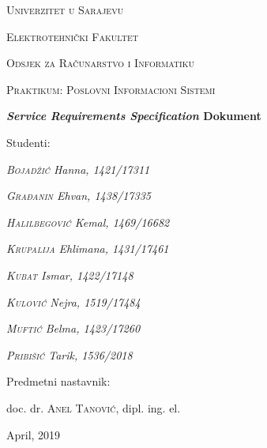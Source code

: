 \begin{titlepage}
	\centering
	{\scshape Univerzitet u Sarajevu \par}
	{\scshape Elektrotehnički Fakultet \par}
	{\scshape Odsjek za Računarstvo i Informatiku \par}
	\vspace{2cm}
	{\Large\scshape Praktikum: Poslovni Informacioni Sistemi\par}
	\vspace{2.5cm}
	{\huge\bfseries \textit{Service Requirements Specification} Dokument\par}
	\vspace{2.5cm}
	\Large Studenti: \par
	{\Large\itshape \textsc{Bojadžić} Hanna, 1421/17311\par}
	{\Large\itshape \textsc{Građanin} Ehvan, 1438/17335\par}
	{\Large\itshape \textsc{Halilbegović} Kemal, 1469/16682\par}
	{\Large\itshape \textsc{Krupalija} Ehlimana, 1431/17461\par}
	{\Large\itshape \textsc{Kubat} Ismar, 1422/17148\par}
	{\Large\itshape \textsc{Kulović} Nejra, 1519/17484\par}
	{\Large\itshape \textsc{Muftić} Belma, 1423/17260\par}
	{\Large\itshape \textsc{Pribišić} Tarik, 1536/2018\par}
	\vfill
	Predmetni nastavnik:\par
	doc. dr. \textsc{Anel Tanović}, dipl. ing. el.
	\vfill
	{\large April, 2019\par}
\end{titlepage}

